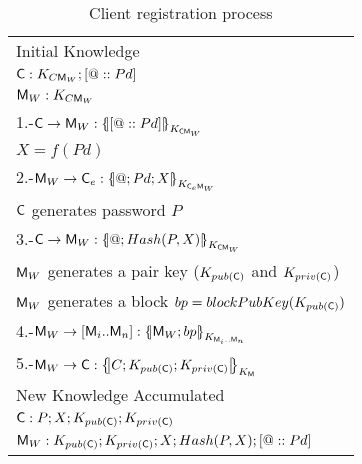 \begin{table}[htb]
\footnotesize
\begin{center}
\caption{Client registration process}
\label{table:reqSessKey}
\begin{tabular}{|l|}
\hline
Initial Knowledge                                                             \\
$\textsf{C}:K_{C\textsf{M}_{W}}; [@::Pd]$                                                    \\
$\textsf{M}_{W}: K_{C\textsf{M}_{W}}$                                                            \\ \hline \hline
1.-$\Client\rightarrow \ServerW:\fat{[@::Pd]}_{K_{\Client\ServerW}}$                     \\
\hspace{5mm} $X=f(Pd) $                           \\ 
2.-$\ServerW\rightarrow \Client_e: \fat{@\lnk Pd \lnk X}_{K_{\Client_e\ServerW}} $                  \\ 
\hspace{5mm} $\textsf{C}$ generates password $P$                          \\  
3.-$\Client\rightarrow \ServerW:\fat{@\lnk Hash(P,X)}_{K_{\Client\ServerW}}$                 \\  
\hspace{5mm} $\textsf{M}_{W}$ generates a pair key ($K_{pub(\textsf{C})}$ and $K_{priv(\textsf{C})}$)\\
\hspace{5mm} $\textsf{M}_{W}$ generates a block $bp = blockPubKey(K_{pub(\textsf{C})})$\\
4.-$\ServerW\rightarrow [\Server_i .. \Server_n]: \fat{\ServerW \lnk bp}_{K_{\Server_i .. \Server_n}}$  \\  
5.-$\ServerW\rightarrow \Client: \fat{C \lnk K_{pub(\Client)}\lnk K_{priv(\Client)}}_{K_{\Server}}$          \\            \hline
New Knowledge Accumulated                                                     \\
$\textsf{C}:P; X ; K_{pub(\textsf{C})}; K_{priv(\textsf{C})}$                                                                \\
$\textsf{M}_{W}: K_{pub(\textsf{C})}; K_{priv(\textsf{C})}; X ; Hash(P,X); [@::Pd]$       \\\hline \hline 
\end{tabular}
\end{center}
\end{table}
\normalsize

